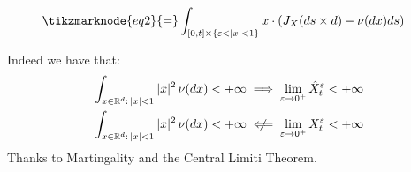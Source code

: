 \begin{definition}
\begin{enumerate}[i)]
\begin{itemize}
\begin{align*}
                    & \tikzmarknode{eq2}{=} \int_{[0,t]\times \{\epsilon < |x|
                    < 1\}} x \cdot (J_X(ds \times d) - \nu(dx) ds) 
                \end{align*} 
            \end{itemize}
    \end{enumerate}
Indeed we have that:
\begin{align*}
    \int_{x\in\R^d: \, |x|<1} |x|^2 \, \nu(dx) < +\infty & \implies \lim_{
        \epsilon \to 0^+} \hat{X}^\epsilon_t < +\infty \\
    \int_{x\in\R^d: \, |x|<1} |x|^2 \, \nu(dx) < +\infty &  \centernot\impliedby
        \lim_{ \epsilon \to 0^+} X^\epsilon_t < +\infty
\end{align*}
Thanks to Martingality and the Central Limiti Theorem.
\end{definition}

